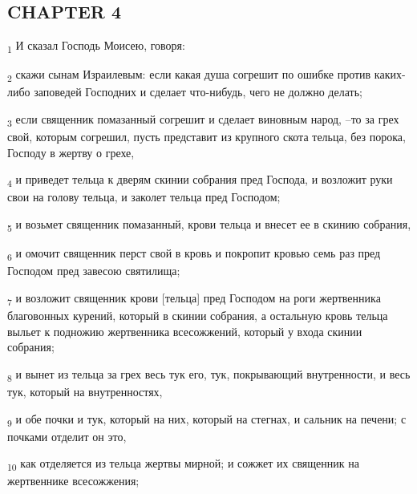 \subsection{CHAPTER 4}
\begin{tcolorbox}
\textsubscript{1} И сказал Господь Моисею, говоря:
\end{tcolorbox}
\begin{tcolorbox}
\textsubscript{2} скажи сынам Израилевым: если какая душа согрешит по ошибке против каких-либо заповедей Господних и сделает что-нибудь, чего не должно делать;
\end{tcolorbox}
\begin{tcolorbox}
\textsubscript{3} если священник помазанный согрешит и сделает виновным народ, --то за грех свой, которым согрешил, пусть представит из крупного скота тельца, без порока, Господу в жертву о грехе,
\end{tcolorbox}
\begin{tcolorbox}
\textsubscript{4} и приведет тельца к дверям скинии собрания пред Господа, и возложит руки свои на голову тельца, и заколет тельца пред Господом;
\end{tcolorbox}
\begin{tcolorbox}
\textsubscript{5} и возьмет священник помазанный, крови тельца и внесет ее в скинию собрания,
\end{tcolorbox}
\begin{tcolorbox}
\textsubscript{6} и омочит священник перст свой в кровь и покропит кровью семь раз пред Господом пред завесою святилища;
\end{tcolorbox}
\begin{tcolorbox}
\textsubscript{7} и возложит священник крови [тельца] пред Господом на роги жертвенника благовонных курений, который в скинии собрания, а остальную кровь тельца выльет к подножию жертвенника всесожжений, который у входа скинии собрания;
\end{tcolorbox}
\begin{tcolorbox}
\textsubscript{8} и вынет из тельца за грех весь тук его, тук, покрывающий внутренности, и весь тук, который на внутренностях,
\end{tcolorbox}
\begin{tcolorbox}
\textsubscript{9} и обе почки и тук, который на них, который на стегнах, и сальник на печени; с почками отделит он это,
\end{tcolorbox}
\begin{tcolorbox}
\textsubscript{10} как отделяется из тельца жертвы мирной; и сожжет их священник на жертвеннике всесожжения;
\end{tcolorbox}
